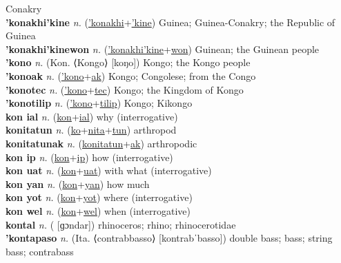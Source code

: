 Conakry \label{'konakhi} \\
\textbf{'konakhi'kine} \textit{n.} (\hyperref['konakhi]{'konakhi}+\hyperref['kine]{'kine})
Guinea; Guinea-Conakry; the Republic of Guinea \label{'konakhi'kine} \\
\textbf{'konakhi'kinewon} \textit{n.} (\hyperref['konakhi'kine]{'konakhi'kine}+\hyperref[won]{won})
Guinean; the Guinean people \label{'konakhi'kinewon} \\
\textbf{'kono} \textit{n.} (Kon. ⟨Kongo⟩ [koŋo])
Kongo; the Kongo people \label{'kono} \\
\textbf{'konoak} \textit{n.} (\hyperref['kono]{'kono}+\hyperref[ak]{ak})
Kongo; Congolese; from the Congo \label{'konoak} \\
\textbf{'konotec} \textit{n.} (\hyperref['kono]{'kono}+\hyperref[tec]{tec})
Kongo; the Kingdom of Kongo \label{'konotec} \\
\textbf{'konotilip} \textit{n.} (\hyperref['kono]{'kono}+\hyperref[tilip]{tilip})
Kongo; Kikongo \label{'konotilip} \\
\textbf{kon ial} \textit{n.} (\hyperref[kon]{kon}+\hyperref[ial]{ial})
why (interrogative) \label{kon ial} \\
\textbf{konitatun} \textit{n.} (\hyperref[ko]{ko}+\hyperref[nita]{nita}+\hyperref[tun]{tun})
arthropod \label{konitatun} \\
\textbf{konitatunak} \textit{n.} (\hyperref[konitatun]{konitatun}+\hyperref[ak]{ak})
arthropodic \label{konitatunak} \\
\textbf{kon ip} \textit{n.} (\hyperref[kon]{kon}+\hyperref[ip]{ip})
how (interrogative) \label{kon ip} \\
\textbf{kon uat} \textit{n.} (\hyperref[kon]{kon}+\hyperref[uat]{uat})
with what (interrogative) \label{kon uat} \\
\textbf{kon yan} \textit{n.} (\hyperref[kon]{kon}+\hyperref[yan]{yan})
how much \label{kon yan} \\
\textbf{kon yot} \textit{n.} (\hyperref[kon]{kon}+\hyperref[yot]{yot})
where (interrogative) \label{kon yot} \\
\textbf{kon wel} \textit{n.} (\hyperref[kon]{kon}+\hyperref[wel]{wel})
when (interrogative) \label{kon wel} \\
\textbf{kontal} \textit{n.} ( [ɡɔndar])
rhinoceros; rhino; rhinocerotidae \label{kontal} \\
\textbf{'kontapaso} \textit{n.} (Ita. ⟨contrabbasso⟩ [kontrabˈbasso])
double bass; bass; string bass; contrabass \label{'kontapaso} \\
